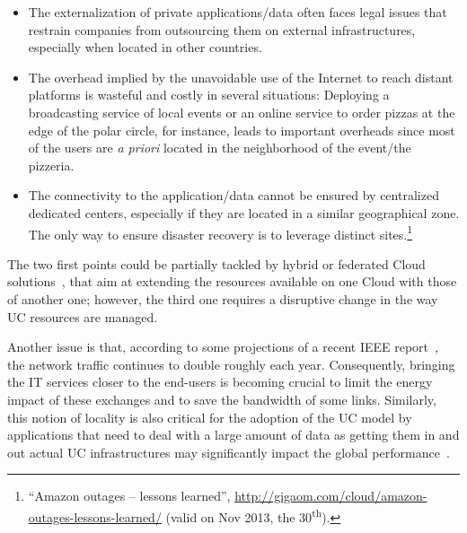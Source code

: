 \begin{itemize}
\item The externalization of private applications/data often faces legal issues that
  restrain companies from outsourcing them on external infrastructures, especially when
  located in other countries.
\item The overhead implied by the unavoidable use of the Internet to reach distant
  platforms is wasteful and costly in several situations: Deploying a broadcasting service
  of local events or an online service to order pizzas at the edge of the polar circle,
  for instance, leads to important overheads since most of the users are \emph{a priori}
  located in the neighborhood of the event/the pizzeria.
\item The connectivity to the application/data cannot be ensured by centralized dedicated
  centers, especially if they are located in a similar geographical zone. The only way to
  ensure disaster recovery is to leverage distinct sites.\footnote{``Amazon outages –
    lessons learned'',
    \href{http://gigaom.com/cloud/amazon-outages-lessons-learned/}{http://gigaom.com/cloud/amazon-outages-lessons-learned/}
    (valid on Nov 2013, the 30\textsuperscript{th}).}
\end{itemize}

The two first points could be partially tackled by hybrid or federated Cloud
solutions~\cite{armbrust:2010}, that aim at extending the resources available on one Cloud
with those of another one; however, the third one requires a disruptive change in the way
UC resources are managed.

Another issue is that, according to some projections of a recent IEEE
report~\cite{ieeenetreport:2012}, the network traffic continues to double roughly each
year. Consequently, bringing the IT services closer to the end-users is becoming crucial
to limit the energy impact of these exchanges and to save the bandwidth of some
links. Similarly, this notion of locality is also critical for the adoption of the UC
model by applications that need to deal with a large amount of data as getting them in and
out actual UC infrastructures may significantly impact the global
performance~\cite{Fos11}.


